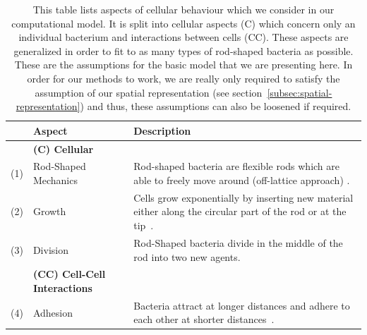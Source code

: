 \documentclass[10pt,letterpaper]{article}
\begin{document}
\begin{table}[H]
    \centering
    \def\arraystretch{1.3}
    \begin{tabularx}{\textwidth}{c l X}
        &\textbf{Aspect} & \textbf{Description}\\
        \toprule
        &\textbf{(C) Cellular}\\
        \midrule
        (1) & Rod-Shaped Mechanics &
            Rod-shaped bacteria are flexible rods which are able to freely move around (off-lattice
            approach) \cite{Takeuchi2005,Ursell2014,Amir2014_2}.\\
        (2) & Growth &
            Cells grow exponentially by inserting new material either along the circular part of the
            rod or at the tip~\cite{Robert2014,Takeuchi2005}.\\
        (3) & Division &
            Rod-Shaped bacteria divide in the middle of the rod into two new agents.\\
        &\textbf{(CC) Cell-Cell Interactions}\\
        \midrule
        (4) & Adhesion &
            Bacteria attract at longer distances and adhere to each other at shorter
            distances~\cite{Verwey1947,Trejo2013}.\\
        \bottomrule
    \end{tabularx}
    \caption{
        This table lists aspects of cellular behaviour which we consider in our computational model.
        It is split into cellular aspects (C) which concern only an individual bacterium and
        interactions between cells (CC).
        These aspects are generalized in order to fit to as many types of rod-shaped bacteria as
        possible.
        These are the assumptions for the basic model that we are presenting here.
        In order for our methods to work, we are really only required to satisfy the assumption of
        our spatial representation (see section~\ref{subsec:spatial-representation}) and thus, these
        assumptions can also be loosened if required.
    }
    \label{table:simulation-aspects}
\end{table}

\end{document}
